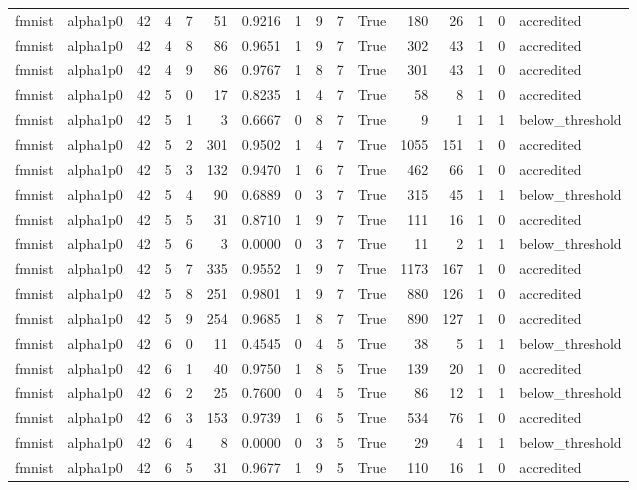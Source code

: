 \begin{tabular}{llrrrrrrrrrrrrrl}
fmnist & alpha1p0 & 42 & 4 & 7 & 51 & 0.9216 & 1 & 9 & 7 & True & 180 & 26 & 1 & 0 & accredited \\
fmnist & alpha1p0 & 42 & 4 & 8 & 86 & 0.9651 & 1 & 9 & 7 & True & 302 & 43 & 1 & 0 & accredited \\
fmnist & alpha1p0 & 42 & 4 & 9 & 86 & 0.9767 & 1 & 8 & 7 & True & 301 & 43 & 1 & 0 & accredited \\
fmnist & alpha1p0 & 42 & 5 & 0 & 17 & 0.8235 & 1 & 4 & 7 & True & 58 & 8 & 1 & 0 & accredited \\
fmnist & alpha1p0 & 42 & 5 & 1 & 3 & 0.6667 & 0 & 8 & 7 & True & 9 & 1 & 1 & 1 & below\_threshold \\
fmnist & alpha1p0 & 42 & 5 & 2 & 301 & 0.9502 & 1 & 4 & 7 & True & 1055 & 151 & 1 & 0 & accredited \\
fmnist & alpha1p0 & 42 & 5 & 3 & 132 & 0.9470 & 1 & 6 & 7 & True & 462 & 66 & 1 & 0 & accredited \\
fmnist & alpha1p0 & 42 & 5 & 4 & 90 & 0.6889 & 0 & 3 & 7 & True & 315 & 45 & 1 & 1 & below\_threshold \\
fmnist & alpha1p0 & 42 & 5 & 5 & 31 & 0.8710 & 1 & 9 & 7 & True & 111 & 16 & 1 & 0 & accredited \\
fmnist & alpha1p0 & 42 & 5 & 6 & 3 & 0.0000 & 0 & 3 & 7 & True & 11 & 2 & 1 & 1 & below\_threshold \\
fmnist & alpha1p0 & 42 & 5 & 7 & 335 & 0.9552 & 1 & 9 & 7 & True & 1173 & 167 & 1 & 0 & accredited \\
fmnist & alpha1p0 & 42 & 5 & 8 & 251 & 0.9801 & 1 & 9 & 7 & True & 880 & 126 & 1 & 0 & accredited \\
fmnist & alpha1p0 & 42 & 5 & 9 & 254 & 0.9685 & 1 & 8 & 7 & True & 890 & 127 & 1 & 0 & accredited \\
fmnist & alpha1p0 & 42 & 6 & 0 & 11 & 0.4545 & 0 & 4 & 5 & True & 38 & 5 & 1 & 1 & below\_threshold \\
fmnist & alpha1p0 & 42 & 6 & 1 & 40 & 0.9750 & 1 & 8 & 5 & True & 139 & 20 & 1 & 0 & accredited \\
fmnist & alpha1p0 & 42 & 6 & 2 & 25 & 0.7600 & 0 & 4 & 5 & True & 86 & 12 & 1 & 1 & below\_threshold \\
fmnist & alpha1p0 & 42 & 6 & 3 & 153 & 0.9739 & 1 & 6 & 5 & True & 534 & 76 & 1 & 0 & accredited \\
fmnist & alpha1p0 & 42 & 6 & 4 & 8 & 0.0000 & 0 & 3 & 5 & True & 29 & 4 & 1 & 1 & below\_threshold \\
fmnist & alpha1p0 & 42 & 6 & 5 & 31 & 0.9677 & 1 & 9 & 5 & True & 110 & 16 & 1 & 0 & accredited \\

\end{tabular}
